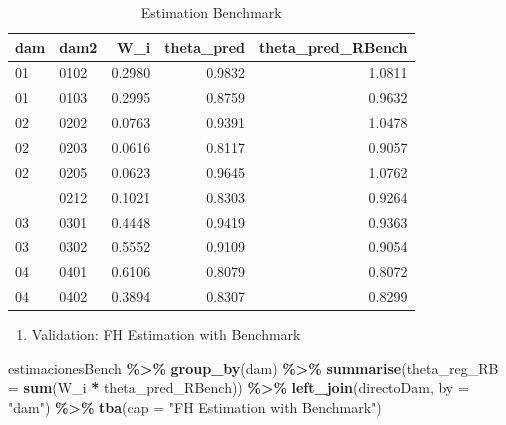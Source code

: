 \documentclass[
  12pt,
]{book}
\newenvironment{Shaded}{\begin{snugshade}}{\end{snugshade}}
\newcommand{\AttributeTok}[1]{\textcolor[rgb]{0.13,0.29,0.53}{#1}}
\newcommand{\FunctionTok}[1]{\textcolor[rgb]{0.13,0.29,0.53}{\textbf{#1}}}
\newcommand{\NormalTok}[1]{#1}
\newcommand{\SpecialCharTok}[1]{\textcolor[rgb]{0.81,0.36,0.00}{\textbf{#1}}}
\newcommand{\StringTok}[1]{\textcolor[rgb]{0.31,0.60,0.02}{#1}}
\providecommand{\tightlist}{%
  \setlength{\itemsep}{0pt}\setlength{\parskip}{0pt}}
\begin{document}
\begin{table}[H]

\caption{\label{tab:unnamed-chunk-23}Estimation Benchmark}
\centering
\begin{tabular}[t]{llrrr}
\toprule
dam & dam2 & W\_i & theta\_pred & theta\_pred\_RBench\\
\midrule
01 & 0102 & 0.2980 & 0.9832 & 1.0811\\
01 & 0103 & 0.2995 & 0.8759 & 0.9632\\
02 & 0202 & 0.0763 & 0.9391 & 1.0478\\
02 & 0203 & 0.0616 & 0.8117 & 0.9057\\
02 & 0205 & 0.0623 & 0.9645 & 1.0762\\
\addlinespace
02 & 0212 & 0.1021 & 0.8303 & 0.9264\\
03 & 0301 & 0.4448 & 0.9419 & 0.9363\\
03 & 0302 & 0.5552 & 0.9109 & 0.9054\\
04 & 0401 & 0.6106 & 0.8079 & 0.8072\\
04 & 0402 & 0.3894 & 0.8307 & 0.8299\\
\bottomrule
\end{tabular}
\end{table}

\begin{enumerate}
\def\labelenumi{\arabic{enumi}.}
\setcounter{enumi}{5}
\tightlist
\item
  Validation: FH Estimation with Benchmark
\end{enumerate}

\begin{Shaded}
\begin{Highlighting}[]
\NormalTok{estimacionesBench }\SpecialCharTok{\%\textgreater{}\%} \FunctionTok{group\_by}\NormalTok{(dam) }\SpecialCharTok{\%\textgreater{}\%}
  \FunctionTok{summarise}\NormalTok{(}\AttributeTok{theta\_reg\_RB =} \FunctionTok{sum}\NormalTok{(W\_i }\SpecialCharTok{*}\NormalTok{ theta\_pred\_RBench)) }\SpecialCharTok{\%\textgreater{}\%}
  \FunctionTok{left\_join}\NormalTok{(directoDam, }\AttributeTok{by =} \StringTok{"dam"}\NormalTok{) }\SpecialCharTok{\%\textgreater{}\%} 
  \FunctionTok{tba}\NormalTok{(}\AttributeTok{cap =} \StringTok{"FH Estimation with Benchmark"}\NormalTok{)}
\end{Highlighting}
\end{Shaded}
\end{document}
